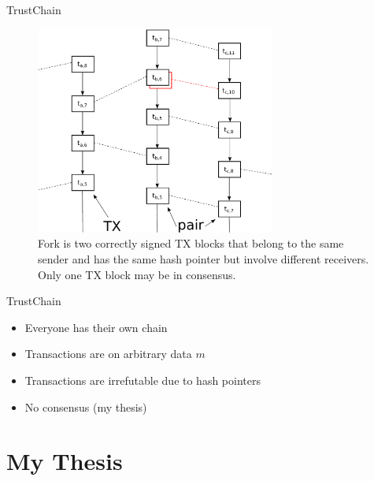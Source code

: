 \documentclass{beamer}
\begin{document}
\begin{frame}{TrustChain}{}

  \begin{figure}[h]
  \includegraphics[width=0.7\textwidth]{trustchain-bad}
  \centering
  \caption{Fork is two correctly signed TX blocks that belong to the same sender
    and has the same hash pointer but involve different receivers. Only one TX
    block may be in consensus.}
  \end{figure}

\end{frame}

\begin{frame}{TrustChain}
  \begin{itemize}
    \item Everyone has their own chain
    \item Transactions are on arbitrary data $m$
    \item Transactions are irrefutable due to hash pointers
    \item No consensus (my thesis)
  \end{itemize}
\end{frame}

\section{My Thesis}
\end{document}
